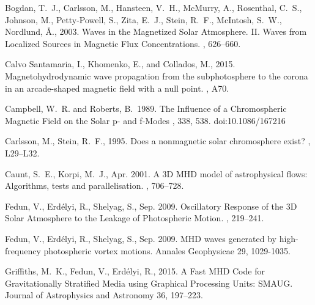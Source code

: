 \documentclass[linenumbers]{aastex63}
\begin{document}
\begin{thebibliography}{}


{Bogdan}, T.~J., {Carlsson}, M., {Hansteen}, V.~H., {McMurry}, A., {Rosenthal},
  C.~S., {Johnson}, M., {Petty-Powell}, S., {Zita}, E.~J., {Stein}, R.~F.,
  {McIntosh}, S.~W., {Nordlund}, {\AA}., 2003. {Waves in the Magnetized Solar
  Atmosphere. II. Waves from Localized Sources in Magnetic Flux
  Concentrations}. , 626--660.

 {Calvo Santamaria}, I., {Khomenko}, E.,  and {Collados}, M., 2015. {Magnetohydrodynamic wave propagation from the subphotosphere to the corona in an arcade-shaped magnetic field with a null point}. , A70.


 {Campbell}, W.~R. and {Roberts}, B.\ 1989. {The Influence of a Chromospheric Magnetic Field on the Solar p- and f-Modes} \apj, 338, 538. doi:10.1086/167216

{Carlsson}, M., {Stein}, R.~F., 1995. {Does a nonmagnetic solar chromosphere
  exist?} , L29--L32.

{Caunt}, S.~E., {Korpi}, M.~J., Apr. 2001. A {3D} {MHD} model of astrophysical
  flows: Algorithms, tests and parallelisation. , 706--728.

{Fedun}, V., {Erd{\'e}lyi}, R., {Shelyag}, S., Sep. 2009. {Oscillatory Response
  of the 3D Solar Atmosphere to the Leakage of Photospheric Motion}. , 219--241.

{Fedun}, V., {Erd{\'e}lyi}, R., {Shelyag}, S., Sep. 2009. {MHD waves generated by high-frequency photospheric vortex motions}. Annales Geophysicae
  29, 1029-1035.

{Griffiths}, M.~K., {Fedun}, V., {Erd{\'e}lyi}, R., 2015. {A Fast MHD Code for
  Gravitationally Stratified Media using Graphical Processing Units: SMAUG}.
  Journal of Astrophysics and Astronomy 36, 197--223.


\end{thebibliography}
\end{document}
